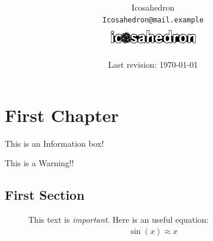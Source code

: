 
\title{\colorbox{warmblack}{{}}}
\author{Icosahedron \\ \texttt{Icosahedron@mail.example} \\
\includegraphics[width=0.3\textwidth]{images/logo_finale.png} } 
\date{ \small Last revision: \today}




\renewcommand{\listtablename}{Tables}

\dominitoc

\setlength{\tabcolsep}{0.5em} %
\renewcommand{\arraystretch}{1.2} %

 
\cleardoublepage

\setcounter{page}{1}
\tableofcontents
\newpage
\setcounter{page}{1}

\pagestyle{fancy}

\chapter{First Chapter}
\minitoc

\begin{info}
    This is an Information box!
\end{info}

\begin{warn}[Warning:]
    This is a Warning!!
\end{warn}
\lipsum[3-5]

\section{First Section}
\begin{figure}
\begin{YStkyNote}

This text is \emph{important}. Here is an useful equation:
\begin{align}
    \sin (x) \approx x
\end{align}
\end{YStkyNote}
\end{figure}


